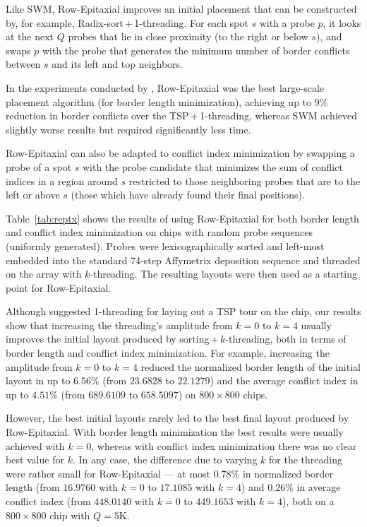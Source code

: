 Like SWM, Row-Epitaxial improves an initial placement that can be constructed
by, for example, Radix-sort\,+\,1-threading. For each spot $s$ with a probe $p$,
it looks at the next $Q$ probes that lie in close proximity (to the right or
below $s$), and swaps $p$ with the probe that generates the minimum number of
border conflicts between $s$ and its left and top neighbors.

In the experiments conducted by \citet{Kahng2003}, Row-Epitaxial was the best
large-scale placement algorithm (for border length minimization), achieving up
to 9\% reduction in border conflicts over the TSP\,+\,1-threading, whereas SWM
achieved slightly worse results but required significantly less time.

Row-Epitaxial can also be adapted to conflict index minimization by swapping a
probe of a spot $s$ with the probe candidate that minimizes the sum of conflict
indices in a region around $s$ restricted to those neighboring probes that are
to the left or above $s$ (those which have already found their final positions).

Table~\ref{tab:reptx} shows the results of using Row-Epitaxial for both border
length and conflict index minimization on chips with random probe sequences
(uniformly generated). Probes were lexicographically sorted and left-most
embedded into the standard 74-step Affymetrix deposition sequence and threaded
on the array with $k$-threading. The resulting layouts were then used as a
starting point for Row-Epitaxial.

Although \citet{Hannenhalli2002} suggested 1-threading for laying out a TSP tour
on the chip, our results show that increasing the threading's amplitude from
$k=0$ to $k=4$ usually improves the initial layout produced by
sorting\,+\,$k$-threading, both in terms of border length and conflict index
minimization. For example, increasing the amplitude from $k=0$ to $k=4$ reduced
the normalized border length of the initial layout in up to $6.56\%$ (from
$23.6828$ to $22.1279$) and the average conflict index in up to $4.51\%$ (from
$689.6109$ to $658.5097$) on $800\times 800$ chips.

However, the best initial layouts rarely led to the best final layout produced
by Row-Epitaxial. With border length minimization the best results were usually
achieved with $k=0$, whereas with conflict index minimization there was no clear
best value for $k$. In any case, the difference due to varying $k$ for the
threading were rather small for Row-Epitaxial --- at most $0.78\%$ in normalized
border length (from $16.9760$ with $k=0$ to $17.1085$ with $k=4$) and $0.26\%$
in average conflict index (from $448.0140$ with $k=0$ to $449.1653$ with $k=4$),
both on a $800\times 800$ chip with $Q=5$K.

